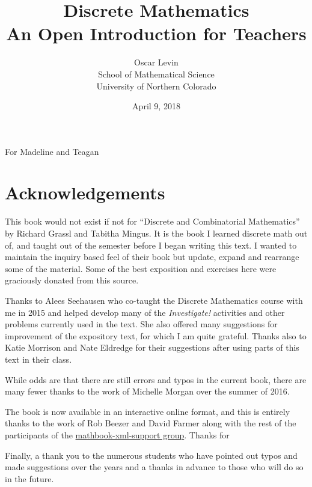 \documentclass[10pt,]{book}
\title{Discrete Mathematics\\
{\large An Open Introduction for Teachers}}
\author{Oscar Levin\\
School of Mathematical Science\\
University of Northern Colorado
}
\date{April 9, 2018}
\theoremstyle{plain}
\theoremstyle{definition}
\theoremstyle{definition}
\theoremstyle{definition}
\theoremstyle{definition}
\numberwithin{equation}{chapter}
\begin{document}
\frontmatter


\cleardoublepage
\thispagestyle{empty}
\begin{flushright}\large%
For Madeline and Teagan%
\end{flushright}
\clearpage
\thispagestyle{empty}
\null%
\clearpage
\chapter*{Acknowledgements}\label{acknowledgement-1}
\hypertarget{p-2}{}%
This book would not exist if not for ``Discrete and Combinatorial Mathematics'' by Richard Grassl and Tabitha Mingus. It is the book I learned discrete math out of, and taught out of the semester before I began writing this text. I wanted to maintain the inquiry based feel of their book but update, expand and rearrange some of the material.  Some of the best exposition and exercises here were graciously donated from this source.%
\par
\hypertarget{p-3}{}%
Thanks to Alees Seehausen who co-taught the Discrete Mathematics course with me in 2015 and helped develop many of the \emph{Investigate!} activities and other problems currently used in the text. She also offered many suggestions for improvement of the expository text, for which I am quite grateful. Thanks also to Katie Morrison and Nate Eldredge for their suggestions after using parts of this text in their class.%
\par
\hypertarget{p-4}{}%
While odds are that there are still errors and typos in the current book, there are many fewer thanks to the work of Michelle Morgan over the summer of 2016.%
\par
\hypertarget{p-5}{}%
The book is now available in an interactive online format, and this is entirely thanks to the work of Rob Beezer and David Farmer along with the rest of the participants of the \href{https://groups.google.com/forum/?fromgroups\#!forum/mathbook-xml-support}{mathbook-xml-support group}.  Thanks for%
\par
\hypertarget{p-6}{}%
Finally, a thank you to the numerous students who have pointed out typos and made suggestions over the years and a thanks in advance to those who will do so in the future.%
\end{document}
